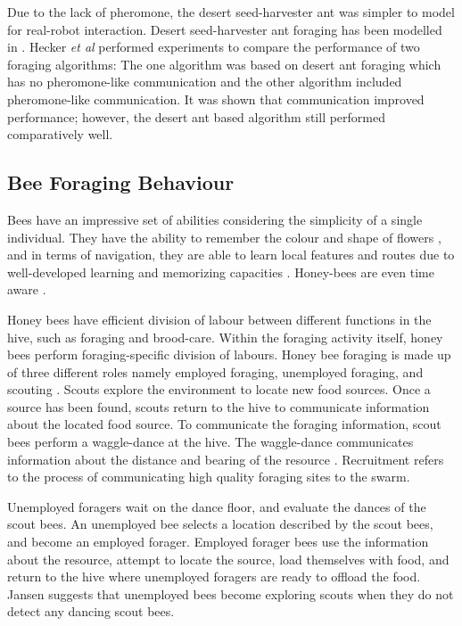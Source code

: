 Due to the lack of pheromone, the desert seed-harvester ant was simpler to model for real-robot interaction. Desert seed-harvester ant foraging has been modelled in \cite{moller1998modeling,hecker2012formica}. Hecker \textit{et al} \cite{hecker2012formica} performed experiments to compare the performance of two foraging algorithms: The one algorithm was based on desert ant foraging which has no pheromone-like communication and the other algorithm included pheromone-like communication. It was shown that communication improved performance; however, the desert ant based algorithm still performed comparatively well. 

\subsection{Bee Foraging Behaviour}
\label{bees:biologicalinspiration}
Bees have an impressive set of abilities considering the simplicity of a single individual. They have the ability to remember the colour and shape of flowers \cite{zhang2006honeybee}, and in terms of navigation, they are able to learn local features and routes due to well-developed learning and memorizing capacities \cite{menzel2001cognitive}. Honey-bees are even time aware \cite{moore1989influence}. 

Honey bees have efficient division of labour between different functions in the hive, such as foraging and brood-care. Within the foraging activity itself, honey bees perform foraging-specific division of labours. Honey bee foraging is made up of three different roles namely employed foraging, unemployed foraging, and scouting \cite{seeley2009wisdom}. Scouts explore the environment to locate new food sources. Once a source has been found, scouts return to the hive to communicate information about the located food source. To communicate the foraging information, scout bees perform a waggle-dance at the hive. The waggle-dance communicates information about the distance and bearing of the resource \cite{riley2005flight}. Recruitment \cite{seeley2009wisdom} refers to the process of communicating high quality foraging sites to the swarm.

Unemployed foragers wait on the dance floor, and evaluate the dances of the scout bees. An unemployed bee selects a location described by the scout bees, and become an employed forager. Employed forager bees use the information about the resource, attempt to locate the source, load themselves with food, and return to the hive where unemployed foragers are ready to offload the food. Jansen \cite{janson2007searching} suggests that unemployed bees become exploring scouts when they do not detect any dancing scout bees. 


